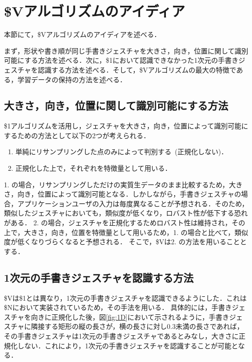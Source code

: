 \section{\$Vアルゴリズムのアイディア}
本節にて，\$Vアルゴリズムのアイディアを述べる．

まず，形状や書き順が同じ手書きジェスチャを大きさ，向き，位置に関して識別可能にする方法を述べる．次に，\$1において認識できなかった1次元の手書きジェスチャを認識する方法を述べる．そして，\$Vアルゴリズムの最大の特徴である，学習データの保持の方法を述べる．

\subsection{大きさ，向き，位置に関して識別可能にする方法}
\$1アルゴリズムを活用し，ジェスチャを大きさ，向き，位置によって識別可能にするための方法として以下の2つが考えられる．
\begin{enumerate}
\item 単純にリサンプリングした点のみによって判別する~(正規化しない)．
\item 正規化した上で，それぞれを特徴量として用いる．
\end{enumerate}
1. の場合，リサンプリングしただけの実質生データのまま比較するため，大きさ，向き，位置によって識別可能となる．しかしながら，手書きジェスチャの場合，アプリケーションユーザの入力は毎度異なることが予想される．そのため，類似したジェスチャにおいても，類似度が低くなり，ロバスト性が低下する恐れがある．
2. の場合，ジェスチャを正規化するためロバスト性は維持され，その上で，大きさ，向き，位置を特徴量として用いるため，1. の場合と比べて，類似度が低くなりづらくなると予想される．
そこで，\$Vは2. の方法を用いることとする．

\subsection{1次元の手書きジェスチャを認識する方法}
\$Vは\$1とは異なり，1次元の手書きジェスチャを認識できるようにした．これは\$N\cite{Anthony:2010:LMR:1839214.1839258}において実装されているため，その手法を用いる．
具体的には，手書きジェスチャを向きに正規化した後，図\ref{fig:1D}において示されるように，手書きジェスチャに隣接する矩形の縦の長さが，横の長さに対し0.3未満の長さであれば，その手書きジェスチャは1次元の手書きジェスチャであるとみなし，大きさに正規化しない．これにより，1次元の手書きジェスチャを認識することが可能となる．

